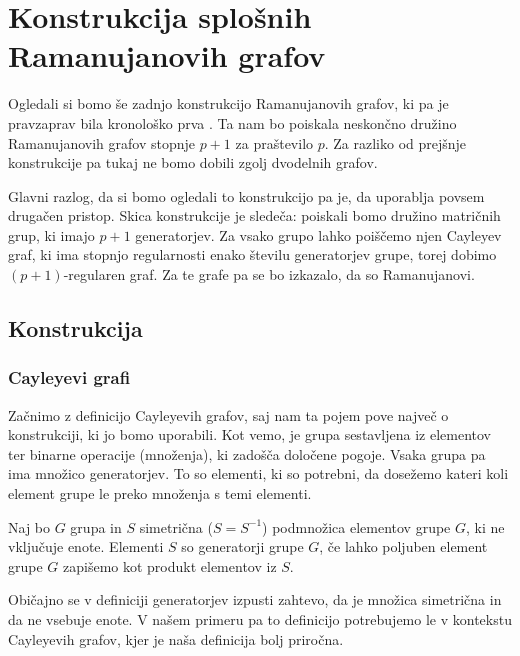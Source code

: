 \section{Konstrukcija splošnih Ramanujanovih grafov}
Ogledali si bomo še zadnjo konstrukcijo Ramanujanovih grafov, ki pa je pravzaprav bila kronološko prva \cite{lps-ramanujan}. Ta nam bo poiskala neskončno družino Ramanujanovih grafov stopnje \(p+1\) za praštevilo \(p\). Za razliko od prejšnje konstrukcije pa tukaj ne bomo dobili zgolj dvodelnih grafov.

Glavni razlog, da si bomo ogledali to konstrukcijo pa je, da uporablja povsem drugačen pristop. Skica konstrukcije je sledeča: poiskali bomo družino matričnih grup, ki imajo \(p+1\) generatorjev. Za vsako grupo lahko poiščemo njen Cayleyev graf, ki ima stopnjo regularnosti enako številu generatorjev grupe, torej dobimo \((p+1)\)-regularen graf. Za te grafe pa se bo izkazalo, da so Ramanujanovi.

\subsection{Konstrukcija}
\subsubsection{Cayleyevi grafi}
Začnimo z definicijo Cayleyevih grafov, saj nam ta pojem pove največ o konstrukciji, ki jo bomo uporabili. Kot vemo, je grupa sestavljena iz elementov ter binarne operacije (množenja), ki zadošča določene pogoje. Vsaka grupa pa ima množico generatorjev. To so elementi, ki so potrebni, da dosežemo kateri koli element grupe le preko množenja s temi elementi.

\begin{definicija}[Generatorji]
    Naj bo \(G\) grupa in \(S\) simetrična (\(S=S^{-1}\)) podmnožica elementov grupe \(G\), ki ne vključuje enote. Elementi \(S\) so generatorji grupe \(G\), če lahko poljuben element grupe \(G\) zapišemo kot produkt elementov iz \(S\).
\end{definicija}
Običajno se v definiciji generatorjev izpusti zahtevo, da je množica simetrična in da ne vsebuje enote. V našem primeru pa to definicijo potrebujemo le v kontekstu Cayleyevih grafov, kjer je naša definicija bolj priročna.

